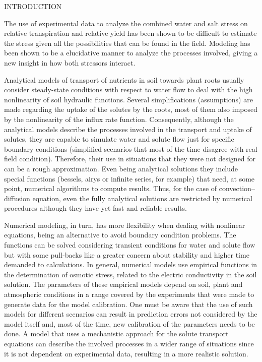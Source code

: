 \cleardoublepage
\chap INTRODUCTION

The use of experimental data to analyze the combined water and salt stress on relative transpiration and relative yield has been shown to be difficult to estimate the stress given all the possibilities that can be found in the field.
Modeling has been shown to be a elucidative manner to analyze the processes involved, giving a new insight in how both stressors interact.

Analytical models of transport of nutrients in soil towards plant roots usually consider steady-state conditions with respect to water flow to deal with the high nonlinearity of soil hydraulic functions. 
Several simplifications (assumptions) are made regarding the uptake of the solutes by the roots, most of them also imposed by the nonlinearity of the influx rate function. 
Consequently, although the analytical models describe the processes involved in the transport and uptake of solutes, they are capable to simulate water and solute flow just for specific boundary conditions (simplified scenarios that most of the time  disagree with real field condition). Therefore, their use in situations that they were not designed for can be a rough approximation.
Even being analytical solutions they include special functions (bessels, airys or infinite series, for example) that need, at some point, numerical algorithms to compute results.
Thus, for the case of convection--diffusion equation, even the fully analytical solutions are restricted by numerical procedures although they have yet fast and reliable results.

Numerical modeling, in turn, has more flexibility when dealing with nonlinear equations, being an alternative to avoid boundary condition problems. 
The functions can be solved considering transient conditions for water and solute flow but with some pull-backs like a greater concern about stability and higher time demanded to calculations.
In general, numerical models use empirical functions in the determination of osmotic stress, related to the electric conductivity in the soil solution. 
The parameters of these empirical models depend on soil, plant and atmospheric conditions in a range covered by the experiments that were made to generate data for the model calibration. 
One must be aware that the use of such models for different scenarios can result in prediction errors 
not considered by the model itself and, most of the time, new calibration of the parameters needs to be done.
A model that uses a mechanistic approach for the solute transport equations can describe the involved processes in a wider range of situations since it is not dependent on experimental data, resulting in a more realistic solution.

